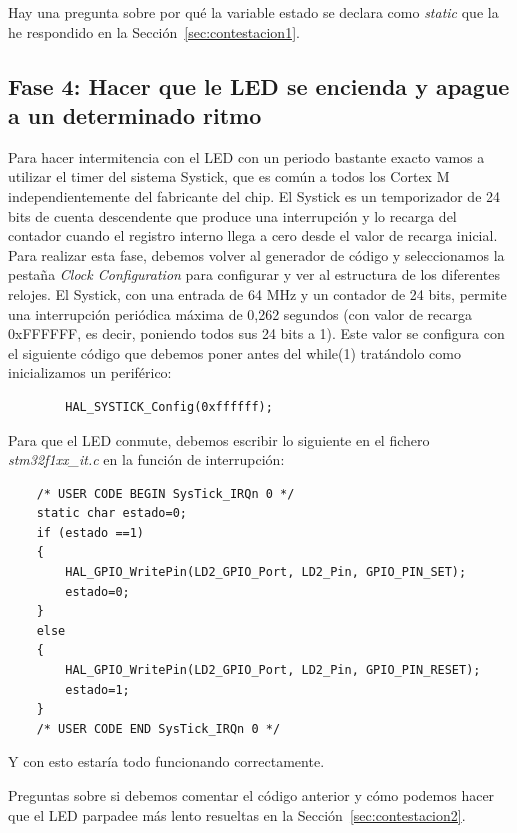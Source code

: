 \documentclass[11pt,a4paper]{article}
\begin{document}
	\begin{tcolorbox}[colback=gray!10, colframe=gray!60, title=Nota informativa]
		Hay una pregunta sobre por qué la variable estado se declara como \textit{static} que la he respondido en la Sección~\ref{sec:contestacion1}.
	\end{tcolorbox}
	
	\subsection{Fase 4: Hacer que le LED se encienda y apague a un determinado ritmo}
	Para hacer intermitencia con el LED con un periodo bastante exacto vamos a utilizar el timer del sistema Systick, que es común a todos los Cortex M independientemente del fabricante del chip. El Systick es un temporizador de 24 bits de cuenta descendente que produce una interrupción y lo recarga del contador cuando el registro interno llega a cero desde el valor de recarga inicial.\\
	
	Para realizar esta fase, debemos volver al generador de código y seleccionamos la pestaña \textit{Clock Configuration} para configurar y ver al estructura de los diferentes relojes. El Systick, con una entrada de 64 MHz y un contador de 24 bits, permite una interrupción periódica máxima de 0,262 segundos (con valor de recarga 0xFFFFFF, es decir, poniendo todos sus 24 bits a 1). Este valor se configura con el siguiente código que debemos poner antes del while(1) tratándolo como inicializamos un periférico:
	\begin{lstlisting}
		HAL_SYSTICK_Config(0xffffff);
	\end{lstlisting}
	\vspace{1em}
	
	Para que el LED conmute, debemos escribir lo siguiente en el fichero \textit{stm32f1xx\_it.c} en la función de interrupción:
	\begin{lstlisting}
	/* USER CODE BEGIN SysTick_IRQn 0 */
	static char estado=0;
	if (estado ==1)
	{
		HAL_GPIO_WritePin(LD2_GPIO_Port, LD2_Pin, GPIO_PIN_SET);
		estado=0;
	}
	else
	{
		HAL_GPIO_WritePin(LD2_GPIO_Port, LD2_Pin, GPIO_PIN_RESET);
		estado=1;
	}
	/* USER CODE END SysTick_IRQn 0 */
	\end{lstlisting}
	\vspace{1em}
	
	Y con esto estaría todo funcionando correctamente.
	
	\begin{tcolorbox}[colback=gray!10, colframe=gray!60, title=Nota informativa]
		Preguntas sobre si debemos comentar el código anterior y cómo podemos hacer que el LED parpadee más lento resueltas en la Sección~\ref{sec:contestacion2}.
	\end{tcolorbox}
	
\end{document}

